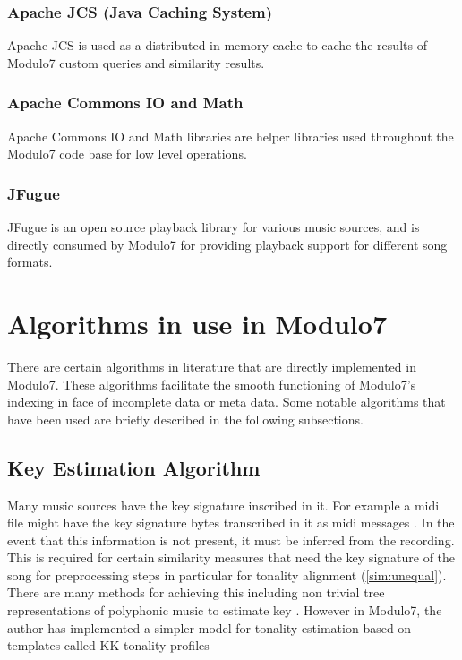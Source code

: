 \subsection {Apache JCS (Java Caching System)} \label{apachejcs}

\noindent Apache JCS is used as a distributed in memory cache to cache the results of Modulo7 custom queries and similarity results. 

\subsection{Apache Commons IO and Math}

\noindent Apache Commons IO and Math libraries are helper libraries used throughout the Modulo7 code base for low level operations. 

\subsection{JFugue}

\noindent JFugue is an open source playback library for various music sources, and is directly consumed by Modulo7 for providing playback support for different song formats. 

\chapter{Algorithms in use in Modulo7}

\noindent There are certain algorithms in literature that are directly implemented in Modulo7. These algorithms facilitate the smooth functioning of Modulo7's indexing in face of incomplete data or meta data. Some notable algorithms that have been used are briefly described in the following subsections.

\section{Key Estimation Algorithm} \label{kktonality}

\noindent Many music sources have the key signature inscribed in it. For example a midi file might have the key signature bytes transcribed in it as midi messages \cite{midispec}. In the event that this information is not present, it must be inferred from the recording. This is required for certain similarity measures that need the key signature of the song for preprocessing steps  in particular for tonality alignment (\ref{sim:unequal}). There are many methods for achieving this including non trivial tree representations of polyphonic music to estimate key \cite{treemodel}. However in Modulo7, the author has implemented a simpler model for tonality estimation based on templates called KK tonality profiles \cite{kkTonalityKeyFinding} \\

